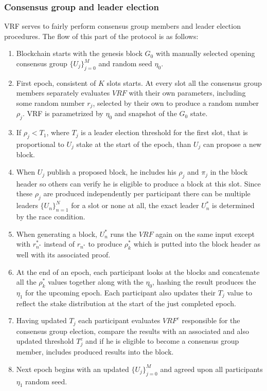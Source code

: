 \subsubsection{Consensus group and leader election}

VRF serves to fairly perform consensus group members and leader election procedures.
The flow of this part of the protocol is as follows:
\begin{enumerate}
    \item Blockchain starts with the genesis block $G_0$ with manually selected opening consensus group $\{U_j\}_{j=0}^M$ and random seed $\eta_0$.
    \item First epoch, consistent of $K$ slots starts.
    At every slot all the consensus group members separately evaluates $VRF$ with their own parameters, including some random number $r_j$, selected by their own to produce a random number $\rho_j$.
    VRF is parametrized by $\eta_0$ and snapshot of the $G_0$ state.
    \item If ${\rho_j} < T_1$, where $T_j$ is a leader election threshold for the first slot, that is proportional to $U_j$ stake at the start of the epoch, than $U_j$ can propose a new block.
    \item  When $U_j$ publish a proposed block, he includes his $\rho_j$ and $\pi_j$ in the block header so others can verify he is eligible to produce a block at this slot.
    Since these $\rho_j$  are produced independently per participant there can be multiple leaders $\{U_n\}_{n=1}^N$ for a slot or none at all, the exact leader $U^*_n$ is
    determined by the race condition.
    \item When generating a block, $U_n^{*}$ runs the $VRF$ again on the same input except with $r^{*}_{n^{*}}$ instead of $r_{n^{*}}$ to produce $\rho^*_k$ which is putted into the block header as well with its associated proof.
    \item At the end of an epoch, each participant looks at the blocks and concatenate all the $\rho^{*}_k$ values together along with the $\eta_0$, hashing the result produces the $\eta_1$ for the upcoming epoch.
    Each participant also updates their $T_j$ value to reflect the stake distribution at the start of the just completed epoch.
    \item Having updated $T_j$ each participant evaluates $VRF^c$ responsible for the consensus group election, compare the results with an associated and also updated threshold $T^c_j$ and if he is eligible to become a consensus group member, includes produced results into the block.
    \item Next epoch begins with an updated $\{U_j\}_{j=0}^M$ and agreed upon all participants $\eta_1$ random seed.
\end{enumerate}


